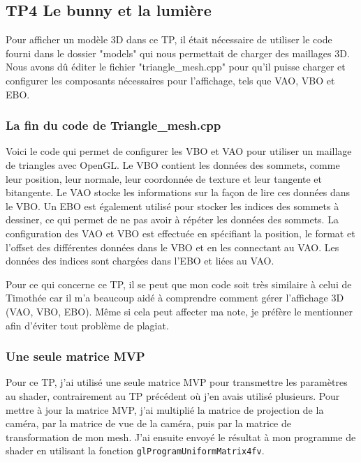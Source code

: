 \documentclass[10pt,a4paper]{article}
\begin{document}
	
	\subsection{TP4 Le bunny et la lumière} %
		Pour afficher un modèle 3D dans ce TP, il était nécessaire de utiliser le code fourni dans le dossier "models" qui nous permettait de charger des maillages 3D. Nous avons dû éditer le fichier "triangle\_mesh.cpp" pour qu'il puisse charger et configurer les composants nécessaires pour l'affichage, tels que VAO, VBO et EBO.

		\subsubsection{La fin du code de Triangle\_mesh.cpp} %
			Voici le code qui permet de configurer les VBO et VAO pour utiliser un maillage de triangles avec OpenGL. Le VBO contient les données des sommets, comme leur position, leur normale, leur coordonnée de texture et leur tangente et bitangente. Le VAO stocke les informations sur la façon de lire ces données dans le VBO. Un EBO est également utilisé pour stocker les indices des sommets à dessiner, ce qui permet de ne pas avoir à répéter les données des sommets. La configuration des VAO et VBO est effectuée en spécifiant la position, le format et l'offset des différentes données dans le VBO et en les connectant au VAO. Les données des indices sont chargées dans l'EBO et liées au VAO.

			

			Pour ce qui concerne ce TP, il se peut que mon code soit très similaire à celui de Timothée car il m'a beaucoup aidé à comprendre comment gérer l'affichage 3D (VAO, VBO, EBO). Même si cela peut affecter ma note, je préfère le mentionner afin d'éviter tout problème de plagiat.

		\subsubsection{Une seule matrice MVP} %
			Pour ce TP, j'ai utilisé une seule matrice MVP pour transmettre les paramètres au shader, contrairement au TP précédent où j'en avais utilisé plusieurs. Pour mettre à jour la matrice MVP, j'ai multiplié la matrice de projection de la caméra, par la matrice de vue de la caméra, puis par la matrice de transformation de mon mesh. J'ai ensuite envoyé le résultat à mon programme de shader en utilisant la fonction \texttt{glProgramUniformMatrix4fv}.
			 
\end{document}
